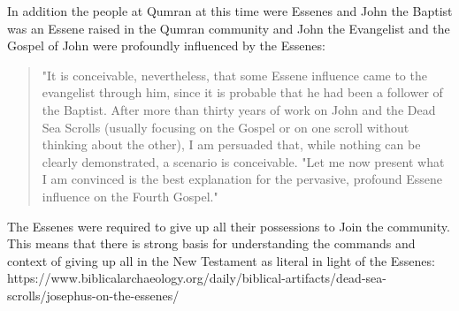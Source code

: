\documentclass[11pt]{article}
\begin{document}
In addition the people at Qumran at this time were Essenes \cite{John the Baptist and the Qumran Connection} and John the Baptist was an Essene raised in the Qumran community\cite{John the Baptist and the Qumran Connection} and John the Evangelist and the Gospel of John were profoundly influenced by the Essenes: 
\begin{quote}
"It is conceivable, nevertheless, that some Essene influence came to the evangelist through him, since it is probable that he had been a follower of the Baptist. After more than thirty years of work on John and the Dead Sea Scrolls (usually focusing on the Gospel or on one scroll without thinking about the other), I am persuaded that, while nothing can be clearly demonstrated, a scenario is conceivable. "Let me now present what I am convinced is the best explanation for the pervasive, profound Essene influence on the Fourth Gospel." \cite{Exploring the Gospel of John}
\end{quote}
The Essenes were required to give up all their possessions to Join the community. \cite{Essenes common property} This means that there is strong basis for understanding the commands and context of giving up all in the New Testament as literal in light of the Essenes: 
https://www.biblicalarchaeology.org/daily/biblical-artifacts/dead-sea-scrolls/josephus-on-the-essenes/
\end{document}
